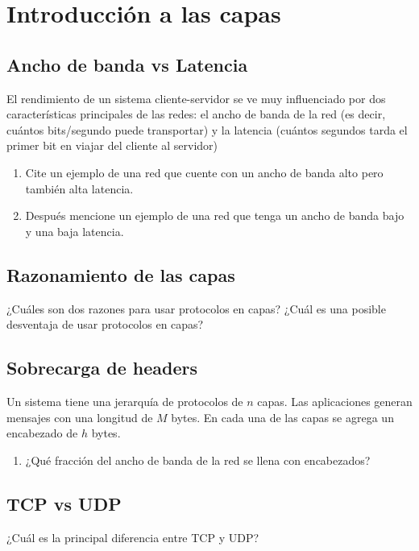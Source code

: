 \documentclass[12pt]{report}
\begin{document}
%
%


\chapter{Introducción a las capas}

\section{Ancho de banda vs Latencia \stwo \steo}
El rendimiento de un sistema cliente-servidor se ve muy influenciado por dos características principales de las redes: el ancho de banda de la red (es decir, cuántos bits/segundo puede transportar) y la latencia (cuántos segundos tarda el primer bit en viajar del cliente al servidor)

\begin{enumerate}
	\item Cite un ejemplo de una red que cuente con un ancho de banda alto pero también alta latencia.
	\item Después mencione un ejemplo de una red que tenga un ancho de banda bajo y una baja latencia.
\end{enumerate}

\section{Razonamiento de las capas \stwo \steo}
¿Cuáles son dos razones para usar protocolos en capas? ¿Cuál es una posible desventaja de usar protocolos en capas?

\section{Sobrecarga de headers \sthree}
Un sistema tiene una jerarquía de protocolos de $n$ capas. Las aplicaciones generan mensajes con una longitud de $M$ bytes. En cada una de las capas se agrega un encabezado de $h$ bytes.

\begin{enumerate}
	\item ¿Qué fracción del ancho de banda de la red se llena con encabezados?
\end{enumerate}

\section{TCP vs UDP \sone \steo}
¿Cuál es la principal diferencia entre TCP y UDP?
\end{document}
